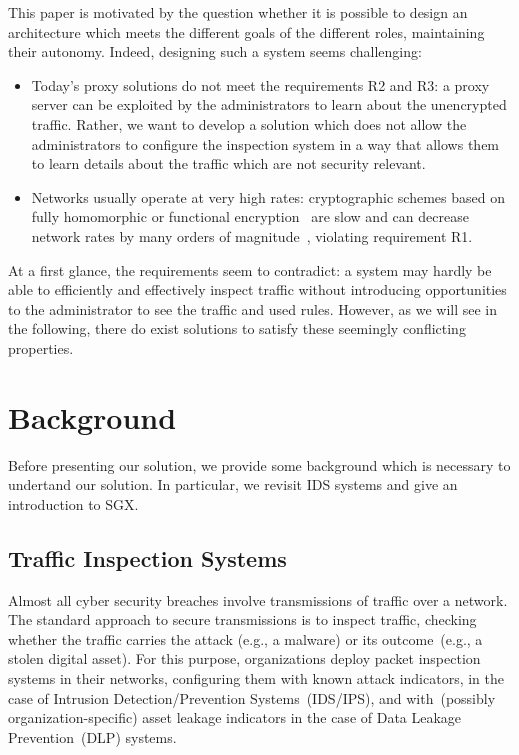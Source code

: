 \documentclass{sig-alternate-10pt}
\begin{document}
This paper is motivated by the question whether it is possible
to design an architecture which meets the different goals of
the different roles, maintaining their autonomy. 
Indeed, designing such a system seems challenging:
\begin{itemize}
\item Today's proxy solutions do not meet the
requirements R2 and R3: 
a proxy
server can be exploited by the administrators to learn about the 
unencrypted traffic. 
Rather, we want to develop a solution which does not allow the administrators
to configure the inspection system in a way that allows them to learn details about 
the traffic which are not security relevant. 
\item
Networks usually operate 
at very high rates: 
cryptographic schemes based on
fully homomorphic or functional encryption~\cite{func-encrypt-1,homomorphic1,
func-encrypt-2}
are slow and can decrease network rates by
many orders of magnitude~\cite{aes-eval}, violating requirement R1.
\end{itemize}

At a first
glance, the requirements seem to contradict: a system 
may hardly be able to efficiently and effectively inspect
traffic without introducing opportunities to the administrator
to see the traffic and used rules.
However, as we will see in the following,
there do exist solutions to satisfy 
these seemingly conflicting
properties.

\section{Background}\label{sec:back}

Before presenting our solution,
we provide some background
which is necessary to undertand our solution. In particular, 
we revisit IDS systems and give an introduction to 
SGX.





\subsection{Traffic Inspection Systems}

Almost all cyber security breaches involve transmissions 
of traffic over a network. 
The standard approach to secure transmissions is to
inspect traffic, checking whether the traffic carries the attack 
(e.g., a malware) or its outcome~(e.g., a stolen digital asset).
For this purpose, organizations deploy packet inspection systems in 
their networks, configuring them with known attack indicators, in the case of 
Intrusion Detection/Prevention Systems~(IDS/IPS), and with~(possibly organization-specific) 
asset leakage indicators in the case of Data Leakage Prevention~(DLP) systems.
\end{document}
